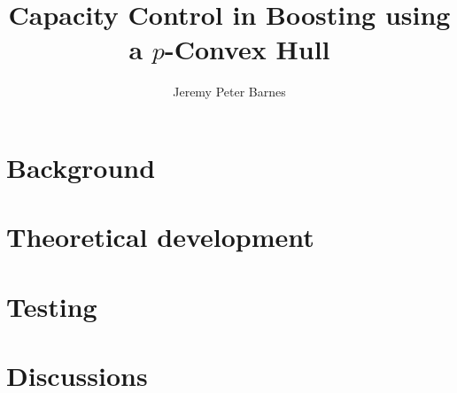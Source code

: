 \documentclass[a4paper,11pt,oneside]{book}
\title{Capacity Control in Boosting using a $p$-Convex Hull}
\author{Jeremy Peter Barnes}
\begin{document}
\frontmatter

\maketitle
\tableofcontents
\listoffigures
\listoftables

\renewcommand{\baselinestretch}{1.0}
\small\normalsize




\mainmatter



\part{Background}




\part{Theoretical development}



\part{Testing}



\part{Discussions}





\appendix

\renewcommand{\baselinestretch}{1.0}
\small\normalsize








\backmatter



\end{document}
